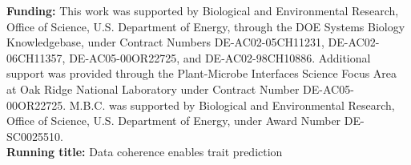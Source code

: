 \begin{titlepage}
  \vspace{0.5cm}
  \textbf{Funding:}
  This work was supported by Biological and Environmental Research, Office of Science, U.S. Department of Energy, through the DOE Systems Biology Knowledgebase, under Contract Numbers DE-AC02-05CH11231, DE-AC02-06CH11357, DE-AC05-00OR22725, and DE-AC02-98CH10886.
  Additional support was provided through the Plant-Microbe Interfaces Science Focus Area at Oak Ridge National Laboratory under Contract Number DE-AC05-00OR22725.
  M.B.C. was supported by Biological and Environmental Research, Office of Science, U.S. Department of Energy, under Award Number DE-SC0025510.\\

  \vspace{0.5cm}
  \textbf{Running title:} Data coherence enables trait prediction\\

  \vspace{1cm}

  \vspace*{\fill}

\end{titlepage}

